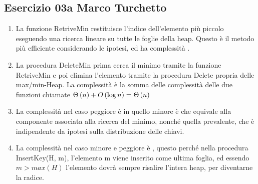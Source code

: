 
\subsection[03a MT]{Esercizio 03a Marco Turchetto}

\begin{enumerate}[label=\alph*)]
%	
	
\item
	La funzione RetriveMin restituisce l'indice dell'elemento più piccolo eseguendo una ricerca lineare su tutte le foglie della heap. 		Questo è il metodo più efficiente considerando le ipotesi, ed ha complessità .
	
	
\item
	La procedura DeleteMin prima cerca il minimo tramite la funzione RetriveMin e poi elimina l'elemento tramite la procedura
	Delete propria delle max/min-Heap.
	La complessità è la somma delle complessità delle due funzioni chiamate \( \Theta\left(n\right) + O\left( \log n\right) = \Theta\left(n\right)\)
	
	
\item
	La complessità nel caso peggiore è in quello minore è  che equivale alla componente associata alla ricerca del
	minimo, nonché quella prevalente, che è indipendente da ipotesi sulla distribuzione delle chiavi.
	
\item
	La complessità nel caso minore e peggiore è , questo perché nella procedura InsertKey(H, m), l'elemento m viene
	inserito come ultima foglia, ed essendo \( m > max(H) \) l'elemento dovrà sempre risalire l'intera heap, per diventarne la radice.
	
		
\end{enumerate}







